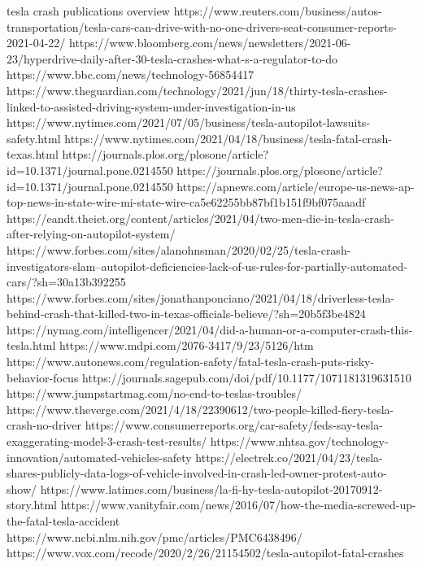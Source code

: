 tesla crash publications overview
https://www.reuters.com/business/autos-transportation/tesla-cars-can-drive-with-no-one-drivers-seat-consumer-reports-2021-04-22/
https://www.bloomberg.com/news/newsletters/2021-06-23/hyperdrive-daily-after-30-tesla-crashes-what-s-a-regulator-to-do
https://www.bbc.com/news/technology-56854417
https://www.theguardian.com/technology/2021/jun/18/thirty-tesla-crashes-linked-to-assisted-driving-system-under-investigation-in-us
https://www.nytimes.com/2021/07/05/business/tesla-autopilot-lawsuits-safety.html
https://www.nytimes.com/2021/04/18/business/tesla-fatal-crash-texas.html
https://journals.plos.org/plosone/article?id=10.1371/journal.pone.0214550
https://journals.plos.org/plosone/article?id=10.1371/journal.pone.0214550
https://apnews.com/article/europe-us-news-ap-top-news-in-state-wire-mi-state-wire-ca5e62255bb87bf1b151f9bf075aaadf
https://eandt.theiet.org/content/articles/2021/04/two-men-die-in-tesla-crash-after-relying-on-autopilot-system/
https://www.forbes.com/sites/alanohnsman/2020/02/25/tesla-crash-investigators-slam--autopilot-deficiencies-lack-of-us-rules-for-partially-automated-cars/?sh=30a13b392255
https://www.forbes.com/sites/jonathanponciano/2021/04/18/driverless-tesla-behind-crash-that-killed-two-in-texas-officials-believe/?sh=20b5f3be4824
https://nymag.com/intelligencer/2021/04/did-a-human-or-a-computer-crash-this-tesla.html
https://www.mdpi.com/2076-3417/9/23/5126/htm
https://www.autonews.com/regulation-safety/fatal-tesla-crash-puts-risky-behavior-focus
https://journals.sagepub.com/doi/pdf/10.1177/1071181319631510
https://www.jumpstartmag.com/no-end-to-teslas-troubles/
https://www.theverge.com/2021/4/18/22390612/two-people-killed-fiery-tesla-crash-no-driver
https://www.consumerreports.org/car-safety/feds-say-tesla-exaggerating-model-3-crash-test-results/
https://www.nhtsa.gov/technology-innovation/automated-vehicles-safety
https://electrek.co/2021/04/23/tesla-shares-publicly-data-logs-of-vehicle-involved-in-crash-led-owner-protest-auto-show/
https://www.latimes.com/business/la-fi-hy-tesla-autopilot-20170912-story.html
https://www.vanityfair.com/news/2016/07/how-the-media-screwed-up-the-fatal-tesla-accident
https://www.ncbi.nlm.nih.gov/pmc/articles/PMC6438496/
https://www.vox.com/recode/2020/2/26/21154502/tesla-autopilot-fatal-crashes


